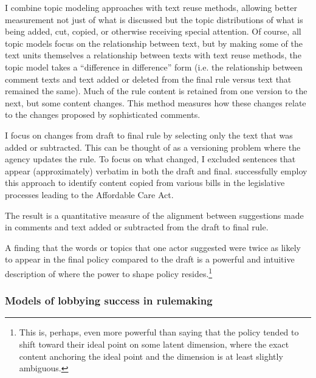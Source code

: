 I combine topic modeling approaches with text reuse methods, allowing better measurement not just of what is discussed but the topic distributions of what is being added, cut, copied, or otherwise receiving special attention. 
Of course, all topic models focus on the relationship between text, but by making some of the text units themselves a relationship between texts with text reuse methods, the topic model takes a ``difference in difference'' form (i.e. the relationship between comment texts and text added or deleted from the final rule versus text that remained the same).  %
Much of the rule content is retained from one version to the next, but some content changes. This method measures how these changes relate to the changes proposed by sophisticated comments. 

I focus on changes from draft to final rule by selecting only the text that was added or subtracted. This can be thought of as a versioning problem where the agency updates the rule. To focus on what changed, I excluded sentences that appear (approximately) verbatim in both the draft and final. %
\citet{Wilkerson2015} successfully employ this approach to identify content copied from various bills in the legislative processes leading to the Affordable Care Act.

The result is a quantitative measure of the alignment between suggestions made in comments and text added or subtracted from the draft to final rule. %

A finding that the words or topics that one actor suggested were twice as likely to appear in the final policy compared to the draft is a powerful and intuitive description of where the power to shape policy resides.\footnote{This is, perhaps, even more powerful than saying that the policy tended to shift toward their ideal point on some latent dimension, where the exact content anchoring the ideal point and the dimension is at least slightly ambiguous.}

\subsubsection{Models of lobbying success in rulemaking}

